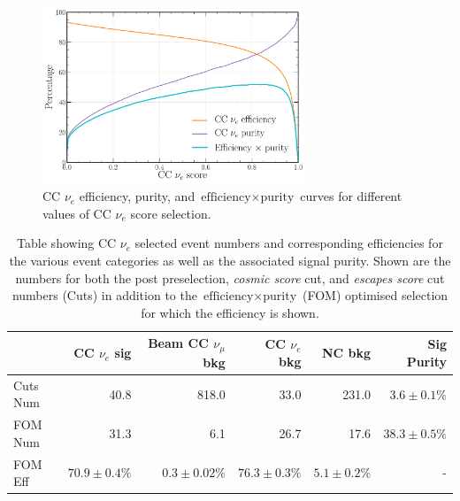\begin{figure} %
    \includegraphics[width=0.7\textwidth]{diagrams/7-results/final_nuel_eff_curves.pdf}
    \caption[CC $\nu_{e}$ efficiency, purity, and $\text{efficiency}\times\text{purity}$ curves]
    {CC $\nu_{e}$ efficiency, purity, and $\text{efficiency}\times\text{purity}$ curves for
        different values of CC $\nu_{e}$ score selection.}
    \label{fig:final_nuel_eff_curves}
\end{figure}

\begin{table}
    \begin{tabular}{lrrrrr}
                 & CC $\nu_{e}$ sig & Beam CC $\nu_{\mu}$ bkg & CC $\nu_{e}$ bkg & NC bkg        & Sig Purity     \\
        \midrule
        Cuts Num & 40.8             & 818.0                   & 33.0             & 231.0         & $3.6\pm0.1\%$  \\
        FOM Num  & 31.3             & 6.1                     & 26.7             & 17.6          & $38.3\pm0.5\%$ \\
        \midrule
        FOM Eff  & $70.9\pm0.4\%$   & $0.3\pm0.02\%$          & $76.3\pm0.3\%$   & $5.1\pm0.2\%$ & -              \\
    \end{tabular}
    \caption[Table showing CC $\nu_{e}$ selected event numbers, efficiencies and signal purity]
    {Table showing CC $\nu_{e}$ selected event numbers and corresponding efficiencies for the
        various event categories as well as the associated signal purity. Shown are the numbers
        for both the post preselection, \emph{cosmic score} cut, and \emph{escapes score} cut
        numbers (Cuts) in addition to the $\text{efficiency}\times\text{purity}$ (FOM) optimised
        selection for which the efficiency is shown.}
    \label{tab:nuel_selection}
\end{table}

